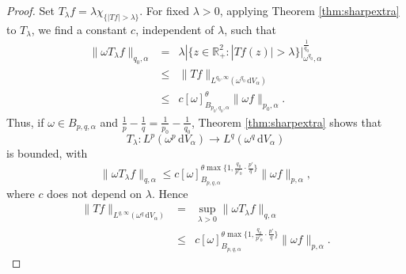 \documentclass[a4paper,11pt,intlimits,oneside]{amsart}
\theoremstyle{definition}
\numberwithin{equation}{section}
\theoremstyle{definition}
\begin{document}
\begin{proof}
Set $T_{\lambda}f = \lambda\chi_{\{|Tf|>\lambda\}}$. For fixed $\lambda>0$, applying Theorem \ref{thm:sharpextra} to $T_{\lambda}$, we find a constant $c$, independent of $\lambda$, such that
\begin{eqnarray*}
\|\omega T_{\lambda}f\|_{q_0,\alpha} & = & \lambda|\{z\in\mathbb{R}_+^2:|Tf(z)|>\lambda\}|_{\omega^{q_0},\alpha}^{\frac{1}{q_0}}\\
 & \le & \|Tf\|_{L^{q_0,\infty}(\omega^{q_0}\,\mathrm{d}V_{\alpha})}\\
 & \le & c[\omega]_{B_{p_0,q_0,\alpha}}^{\theta}\|\omega f\|_{p_0,\alpha}.
\end{eqnarray*}
Thus, if $\omega\in B_{p,q,\alpha}$ and $\frac{1}{p} - \frac{1}{q} = \frac{1}{p_0} - \frac{1}{q_0}$, Theorem \ref{thm:sharpextra} shows that
$$T_{\lambda}: L^p(\omega^p\,\mathrm{d}V_{\alpha})\longrightarrow L^q(\omega^q\,\mathrm{d}V_{\alpha})$$
is bounded, with
$$\| \omega T_{\lambda}f\|_{q,\alpha}\le c[\omega]_{B_{p,q,\alpha}}^{\theta\max\{1,\frac{q_0}{p'_0}\cdot\frac{p'}{q}\}}\|\omega f\|_{p,\alpha},$$
where $c$ does not depend on $\lambda$. Hence
\begin{eqnarray*}
\| Tf\|_{L^{q,\infty}(\omega^{q}\,\mathrm{d}V_{\alpha})} & = & \sup_{\lambda>0}\|\omega T_{\lambda}f\|_{q,\alpha}\\
&\le& c[\omega]_{B_{p,q,\alpha}}^{\theta\max\{1,\frac{q_0}{p'_0}\cdot\frac{p'}{q}\}}\|\omega f\|_{p,\alpha}.
\end{eqnarray*}
\end{proof}
\end{document}
